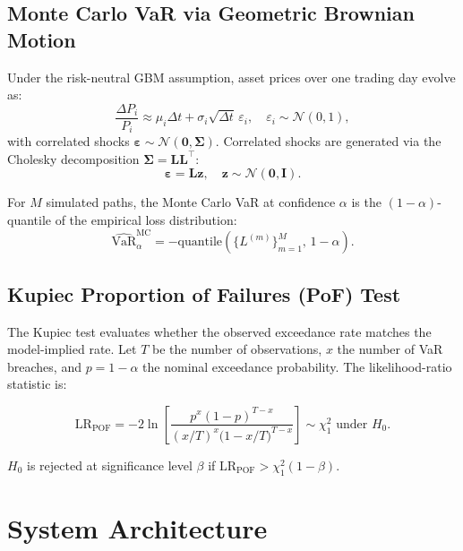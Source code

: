 \documentclass[12pt, a4paper]{article}
\newcommand{\VaR}{\mathrm{VaR}}
\newcommand{\N}{\mathcal{N}}
\begin{document}
\subsection{Monte Carlo VaR via Geometric Brownian Motion}

Under the risk-neutral GBM assumption, asset prices over one trading day
evolve as:
\begin{equation}
  \frac{\Delta P_i}{P_i} \approx \mu_i \Delta t
    + \sigma_i \sqrt{\Delta t}\, \varepsilon_i,
  \quad \varepsilon_i \sim \N(0,1),
  \label{eq:gbm}
\end{equation}
with correlated shocks $\bm{\varepsilon} \sim \N(\bm{0}, \bm{\Sigma})$.
Correlated shocks are generated via the Cholesky decomposition
$\bm{\Sigma} = \bm{L}\bm{L}^\top$:
\begin{equation}
  \bm{\varepsilon} = \bm{L} \bm{z}, \quad \bm{z} \sim \N(\bm{0}, \bm{I}).
  \label{eq:cholesky}
\end{equation}

For $M$ simulated paths, the Monte Carlo VaR at confidence $\alpha$ is the
$(1-\alpha)$-quantile of the empirical loss distribution:
\begin{equation}
  \widehat{\VaR}_{\alpha}^{\mathrm{MC}}
    = -\mathrm{quantile}(\{L^{(m)}\}_{m=1}^{M},\, 1-\alpha).
  \label{eq:mc_var}
\end{equation}

\subsection{Kupiec Proportion of Failures (PoF) Test}

The Kupiec test \citep{kupiec1995} evaluates whether the observed
exceedance rate matches the model-implied rate.  Let $T$ be the number
of observations, $x$ the number of VaR breaches, and $p = 1 - \alpha$
the nominal exceedance probability.  The likelihood-ratio statistic is:

\begin{equation}
  \mathrm{LR}_{\mathrm{POF}}
    = -2\ln\!\left[\frac{p^x (1-p)^{T-x}}
                        {(x/T)^x \bigl(1-x/T\bigr)^{T-x}}\right]
    \sim \chi^2_1 \text{ under } H_0.
  \label{eq:kupiec}
\end{equation}

$H_0$ is rejected at significance level $\beta$ if
$\mathrm{LR}_{\mathrm{POF}} > \chi^2_1(1-\beta)$.

\section{System Architecture}
\label{sec:architecture}
\end{document}
